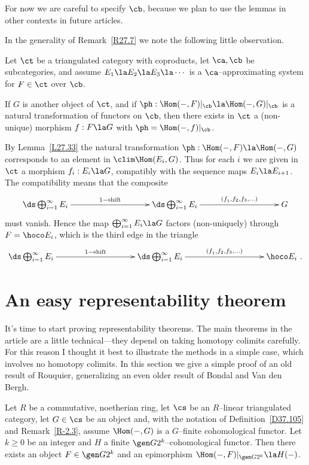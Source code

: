 \documentclass[11pt]{amsart}
\begin{document}
For now we are careful to specify $\cb$, because we plan to use the
lemmas in other contexts in future articles. 
\ermk

In the generality of Remark~\ref{R27.7} we note the following
little observation.

Let $\ct$ be a triangulated category with coproducts, let $\ca,\cb$
be subcategories, and assume $E_1\la E_2\la E_3\la\cdots$ is
a $\ca$--approximating system for $F\in\ct$ over $\cb$.

If $G$ is another object of $\ct$, and
if $\ph:\Hom(-,F)|_\cb\la\Hom(-,G)|_\cb$
is a natural transformation of functors on $\cb$, then there exists in
$\ct$ a
(non-unique) morphism $f:F\la G$ with $\ph=\Hom(-,f)|_\cb$.
\elem

\prf
By Lemma~\ref{L27.33} the natural transformation $\ph:\Hom(-,F)\la \Hom(-,G)$
corresponds to an element in $\clim\Hom(E_i,G)$. Thus for each $i$ we are
given in $\ct$ a
morphism $f_i:E_i\la G$, compatibly with the sequence maps $E_i\la E_{i+1}$.
The compatibility means that the composite
\[\xymatrix@C+20pt{
  \ds\bigoplus_{i=1}^\infty E_i\ar[rr]^-{1-\text{\rm shift}} &&
  \ds\bigoplus_{i=1}^\infty E_i \ar[rr]^-{(f_1^{},f_2,f_3,\ldots)} && G
}\]
must vanish. Hence the map $\bigoplus_{i=1}^\infty E_i\la G$ factors
(non-uniquely) through
$F=\hoco E_i$, which is the third edge in the triangle
\[\xymatrix@C+20pt{
  \ds\bigoplus_{i=1}^\infty E_i\ar[rr]^-{1-\text{\rm shift}} &&
  \ds\bigoplus_{i=1}^\infty E_i \ar[rr]^-{(f_1^{},f_2,f_3,\ldots)} && \hoco E_i\ .
}\]
\eprf


\section{An easy representability theorem}
\label{S74}

It's time to start proving representability theorems. The main theorems
in the article are a little technical---they depend on taking homotopy colimits
carefully. For this reason I thought it best to illustrate the
methods in a simple case, which involves no homotopy
colimits. In this section we give a simple proof of an old
result of Rouquier, generalizing an even older result of Bondal and
Van den Bergh.


Let $R$ be a commutative, noetherian ring, let
$\cs$ be an $R$--linear triangulated
category, let $G\in\cs$ be an object and,
with the notation of Definition~\ref{D37.105}
and Remark~\ref{R-2.3}, assume
$\Hom(-,G)$ is a $G$--finite cohomological functor.
Let $k\geq0$ be an integer and
$H$ a finite $\gen G{2^k}$--cohomological functor. Then
there exists an object
$F\in\gen G{2^k}$ and an epimorphism $\Hom(-,F)|_{\gen G{2^k}}\la H(-)$.
\elem
\end{document}
